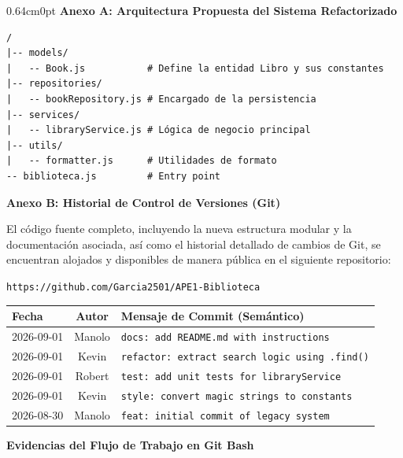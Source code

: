 \documentclass[12pt,letterpaper]{article}
\begin{document}
\vspace{4pt}
\begin{adjustwidth}{0.64cm}{0pt}
\textbf{Anexo A: Arquitectura Propuesta del Sistema Refactorizado}

\begin{lstlisting}[frame=single, numbers=none]
/
|-- models/
|   -- Book.js           # Define la entidad Libro y sus constantes
|-- repositories/
|   -- bookRepository.js # Encargado de la persistencia
|-- services/
|   -- libraryService.js # Lógica de negocio principal
|-- utils/
|   -- formatter.js      # Utilidades de formato
-- biblioteca.js         # Entry point
\end{lstlisting}

\vspace{10pt}
\textbf{Anexo B: Historial de Control de Versiones (Git)}

\vspace{4pt}
El c\'odigo fuente completo, incluyendo la nueva estructura modular y la documentaci\'on asociada, as\'i como el historial detallado de cambios de Git, se encuentran alojados y disponibles de manera p\'ublica en el siguiente repositorio:

\begin{center}
\texttt{https://github.com/Garcia2501/APE1-Biblioteca}
\end{center}

\vspace{4pt}
\begin{table}[H]
\centering
\small
\renewcommand{\arraystretch}{1.2}
\begin{tabularx}{\linewidth}{|l|c|X|}
\hline
\textbf{Fecha} & \textbf{Autor} & \textbf{Mensaje de Commit (Semántico)} \\
\hline
2026-09-01 & Manolo & \texttt{docs: add README.md with instructions} \\
\hline
2026-09-01 & Kevin & \texttt{refactor: extract search logic using .find()} \\
\hline
2026-09-01 & Robert & \texttt{test: add unit tests for libraryService} \\
\hline
2026-09-01 & Kevin & \texttt{style: convert magic strings to constants} \\
\hline
2026-08-30 & Manolo & \texttt{feat: initial commit of legacy system} \\
\hline
\end{tabularx}
\end{table}

\vspace{10pt}
\textbf{Evidencias del Flujo de Trabajo en Git Bash}


\end{adjustwidth}
\end{document}
